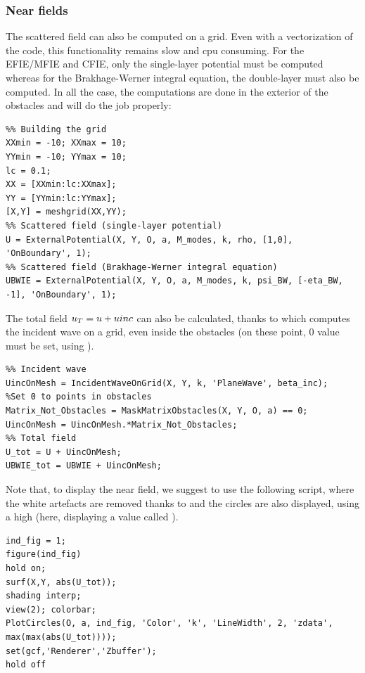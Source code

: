 \subsubsection{Near fields}

The scattered field can also be computed on a grid. Even with a vectorization of the code, this functionality remains slow and cpu consuming. For the EFIE/MFIE and CFIE, only the single-layer potential must be computed whereas for the Brakhage-Werner integral equation, the double-layer must also be computed. In all the case, the computations are done in the exterior of the obstacles and \ExternalPotential will do the job properly:

\begin{lstlisting}
%% Building the grid
XXmin = -10; XXmax = 10;
YYmin = -10; YYmax = 10;
lc = 0.1;
XX = [XXmin:lc:XXmax];
YY = [YYmin:lc:YYmax];
[X,Y] = meshgrid(XX,YY);
%% Scattered field (single-layer potential)
U = ExternalPotential(X, Y, O, a, M_modes, k, rho, [1,0], 'OnBoundary', 1);
%% Scattered field (Brakhage-Werner integral equation)
UBWIE = ExternalPotential(X, Y, O, a, M_modes, k, psi_BW, [-eta_BW, -1], 'OnBoundary', 1);
\end{lstlisting}

The total field $u_T = u + uinc$ can also be calculated, thanks to \IncidentWaveOnGrid which computes the incident wave on a grid, even inside the obstacles (on these point, $0$ value must be set, using \MaskMatrixObstacles).

\begin{lstlisting}
%% Incident wave
UincOnMesh = IncidentWaveOnGrid(X, Y, k, 'PlaneWave', beta_inc);
%Set 0 to points in obstacles
Matrix_Not_Obstacles = MaskMatrixObstacles(X, Y, O, a) == 0;
UincOnMesh = UincOnMesh.*Matrix_Not_Obstacles;
%% Total field
U_tot = U + UincOnMesh;
UBWIE_tot = UBWIE + UincOnMesh;
\end{lstlisting}

Note that, to display the near field, we suggest to use the following script, where the white artefacts are removed thanks to  and the circles are also displayed, using a high  (here, displaying a value called ).

\begin{lstlisting}
ind_fig = 1;
figure(ind_fig)
hold on;
surf(X,Y, abs(U_tot));
shading interp;
view(2); colorbar;
PlotCircles(O, a, ind_fig, 'Color', 'k', 'LineWidth', 2, 'zdata', max(max(abs(U_tot))));
set(gcf,'Renderer','Zbuffer');
hold off
\end{lstlisting}

